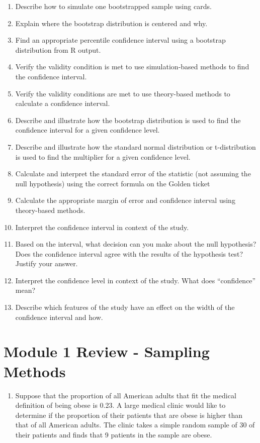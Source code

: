 \documentclass[
]{report}
\providecommand{\tightlist}{%
  \setlength{\itemsep}{0pt}\setlength{\parskip}{0pt}}
\begin{document}
\begin{enumerate}
\def\labelenumi{\arabic{enumi}.}
\setcounter{enumi}{26}
\item
  Describe how to simulate one bootstrapped sample using cards.
\item
  Explain where the bootstrap distribution is centered and why.
\item
  Find an appropriate percentile confidence interval using a bootstrap distribution from R output.
\item
  Verify the validity condition is met to use simulation-based methods to find the confidence interval.
\item
  Verify the validity conditions are met to use theory-based methods to calculate a confidence interval.
\item
  Describe and illustrate how the bootstrap distribution is used to find the confidence interval for a given confidence level.
\item
  Describe and illustrate how the standard normal distribution or t-distribution is used to find the multiplier for a given confidence level.
\item
  Calculate and interpret the standard error of the statistic (not assuming the null hypothesis) using the correct formula on the Golden ticket
\item
  Calculate the appropriate margin of error and confidence interval using theory-based methods.
\item
  Interpret the confidence interval in context of the study.
\item
  Based on the interval, what decision can you make about the null hypothesis? Does the confidence interval agree with the results of the hypothesis test? Justify your answer.
\item
  Interpret the confidence level in context of the study. What does ``confidence'' mean?
\item
  Describe which features of the study have an effect on the width of the confidence interval and how.
\end{enumerate}

\newpage

\section{Module 1 Review - Sampling Methods}\label{module-1-review---sampling-methods}

\begin{enumerate}
\def\labelenumi{\arabic{enumi}.}
\tightlist
\item
  Suppose that the proportion of all American adults that fit the medical definition of being obese is 0.23. A large medical clinic would like to determine if the proportion of their patients that are obese is higher than that of all American adults. The clinic takes a simple random sample of 30 of their patients and finds that 9 patients in the sample are obese.
\end{enumerate}
\end{document}
